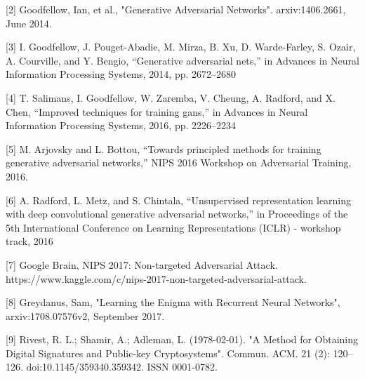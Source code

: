 \documentclass[12pt]{article}
\begin{document}
[2] Goodfellow, Ian, et al., "Generative Adversarial Networks". arxiv:1406.2661, June 2014.
\newline

[3] I. Goodfellow, J. Pouget-Abadie, M. Mirza, B. Xu, D. Warde-Farley, S. Ozair, A. Courville, and Y. Bengio, “Generative adversarial nets,”
in Advances in Neural Information Processing Systems, 2014, pp. 2672–2680
\newline

[4] T. Salimans, I. Goodfellow, W. Zaremba, V. Cheung, A. Radford,
and X. Chen, “Improved techniques for training gans,” in Advances
in Neural Information Processing Systems, 2016, pp. 2226–2234
\newline

[5] M. Arjovsky and L. Bottou, “Towards principled methods for
training generative adversarial networks,” NIPS 2016 Workshop
on Adversarial Training, 2016.
\newline

[6] A. Radford, L. Metz, and S. Chintala, “Unsupervised representation
learning with deep convolutional generative adversarial
networks,” in Proceedings of the 5th International Conference on
Learning Representations (ICLR) - workshop track, 2016
\newline

[7] Google Brain, NIPS 2017: Non-targeted Adversarial Attack. https://www.kaggle.com/c/nips-2017-non-targeted-adversarial-attack.
\newline

[8] Greydanus, Sam, "Learning the Enigma with Recurrent Neural Networks", arxiv:1708.07576v2, September 2017.
\newline

[9] Rivest, R. L.; Shamir, A.; Adleman, L. (1978-02-01). "A Method for Obtaining Digital Signatures and Public-key Cryptosystems". Commun. ACM. 21 (2): 120–126. doi:10.1145/359340.359342. ISSN 0001-0782.
\newline
\end{document}
